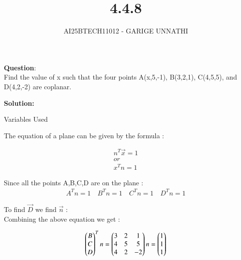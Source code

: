 \documentclass[journal]{IEEEtran}
\begin{document}



\title{4.4.8}
\author{AI25BTECH11012 - GARIGE UNNATHI}
{\let\newpage\relax\maketitle}


\renewcommand{\thefigure}{\theenumi}
\renewcommand{\thetable}{\theenumi}
\setlength{\intextsep}{10pt} %



\vspace{-1cm}

\textbf{Question}:\\
Find the value of x such that the four points A(x,5,-1), B(3,2,1), C(4,5,5), and
D(4,2,-2) are coplanar.


\textbf{Solution: }

 \begin{table}[h!]    
      \centering
      
      \caption{Variables Used}
      \label{}
    \end{table}

The equation of a plane can be given by the formula :
         
\begin{align}
    n^{T}\vec{x} = 1\\
    or\\
    x^{T}n =1 
\end{align}

Since all the points A,B,C,D are on the plane :
\begin{align}
   A^{T}n =1 \quad  B^{T}n =1 \quad  C^{T}n =1 \quad  D^{T}n =1 
\end{align}

To find $\vec{D}$ we find $\vec{n}$ :\\
Combining the above equation we get :


\begin{align}
  \begin{pmatrix}B \\ C \\ D\end{pmatrix}^{T}n  = \begin{pmatrix}3 & 2 & 1\\
                                     4 & 5  &  5 \\
                                     4 & 2 &-2\end{pmatrix}n  = \begin{pmatrix}1\\1\\1\end{pmatrix}
\end{align}
\end{document}
